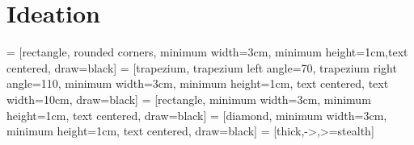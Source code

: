 \documentclass[a4paper, 17pt]{extarticle}
\begin{document}
\newpage

\section{Ideation}
\usetikzlibrary{shapes.geometric, arrows}

 = [rectangle, rounded corners, minimum width=3cm, minimum height=1cm,text centered, draw=black]
 = [trapezium, trapezium left angle=70, trapezium right angle=110, minimum width=3cm, minimum height=1cm, text centered, text width=10cm, draw=black]
 = [rectangle, minimum width=3cm, minimum height=1cm, text centered, draw=black]
 = [diamond, minimum width=3cm, minimum height=1cm, text centered, draw=black]
 = [thick,->,>=stealth]
\end{document}
